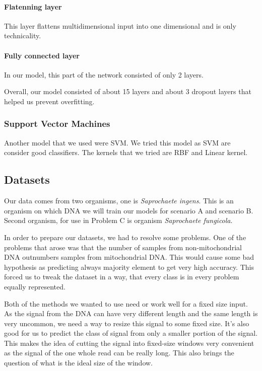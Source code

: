 \paragraph{Flatenning layer}
This layer flattens multidimensional input into one dimensional and is only technicality.

\paragraph{Fully connected layer}

In our model, this part of the network consisted of only 2 layers.

Overall, our model consisted of about 15 layers and about 3 dropout layers that
helped us prevent overfitting.

\subsubsection{Support Vector Machines}

Another model that we used were SVM. We tried this model as SVM are consider good
classifiers. The kernels that we tried are RBF and Linear kernel.

\subsection{Datasets}

Our data comes from two organisms, one is \emph{Saprochaete ingens}. This is an organism
on which DNA we will train our models for scenario A and scenario B. Second organism,
for use in Problem C is organism \emph{Saprochaete fungicola}.

In order to prepare our datasets, we had to resolve some problems. One of the
problems that arose was that the number of samples from non-mitochondrial DNA
outnumbers samples from mitochondrial DNA. This would cause some bad hypothesis
as predicting always majority element to get very high accuracy. This forced us
to tweak the dataset in a way, that every class is in every problem equally represented.

Both of the methods we wanted to use need or work well for a fixed size input.
As the signal from the DNA can have very different length and the same length is
very uncommon, we need a way to resize this signal to some fixed size. It’s also
good for us to predict the class of signal from only a smaller portion of the signal.
This makes the idea of cutting the signal into fixed-size windows very convenient
as the signal of the one whole read can be really long. This also brings the question
of what is the ideal size of the window.

